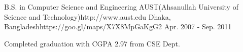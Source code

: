 

\begin{workentries}

  \workentry
    {B.S. in Computer Science and Engineering} %
    {AUST(Ahsanullah University of Science and Technology)}{http://www.aust.edu} %
    {Dhaka, Bangladesh}{https://goo.gl/maps/X7X8MpGaKgG2} %
    {Apr. 2007 - Sep. 2011} %
    {
      \begin{workitems} %
        \item {Completed graduation with CGPA 2.97 from CSE Dept.}
      \end{workitems}
    }

\end{workentries}

